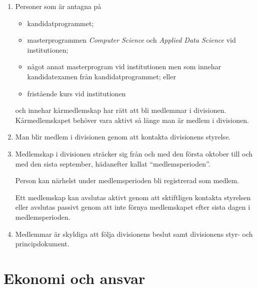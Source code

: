 \documentclass{dvd}
\begin{document}
	\begin{enumerate}[label=\arabic* §, ref=\arabic*]

		\item Personer som är antagna på

		\begin{itemize}
			\item kandidatprogrammet;

			\item masterprogrammen \emph{Computer Science} och \emph{Applied Data Science} vid institutionen;

			\item något annat masterprogram vid institutionen men som innehar kandidatexamen från kandidatprogrammet; eller

			\item fristående kurs vid institutionen
		\end{itemize}

		och innehar kårmedlemskap har rätt att bli medlemmar i divisionen.
		Kårmedlemskapet behöver vara aktivt så länge man är medlem i divisionen.

		\item Man blir medlem i divisionen genom att kontakta divisionens styrelse.

		\item Medlemskap i divisionen sträcker sig från och med den första oktober till och med den sista september, hädanefter kallat ``medlemsperioden''.

		Person kan närhelst under medlemsperioden bli registrerad som medlem.

		Ett medlemskap kan avslutas aktivt genom att sktiftligen kontakta styrelsen eller avslutas passivt genom att inte förnya medlemskapet efter sista dagen i medlemsperioden.

		\item Medlemmar är skyldiga att följa divisionens beslut samt divisionens styr- och principdokument.
	\end{enumerate}

	\section{Ekonomi och ansvar}
\end{document}
